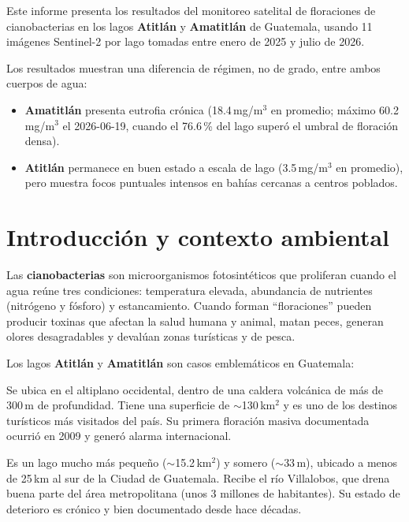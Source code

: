 \documentclass[12pt, a4paper]{article}
\newcommand{\lago}[1]{\textbf{#1}}
\newcommand{\mgm}{\,mg/m$^3$}
\newcommand{\kmsq}{\,km$^2$}
\begin{document}
Este informe presenta los resultados del monitoreo satelital de floraciones de cianobacterias
en los lagos \lago{Atitlán} y \lago{Amatitlán} de Guatemala, usando 11 imágenes
Sentinel-2 por lago tomadas entre enero de 2025 y julio de 2026.

Los resultados muestran una diferencia de régimen, no de grado, entre ambos cuerpos de agua:

\begin{itemize}[leftmargin=1.5em]
  \item \lago{Amatitlán} presenta eutrofia crónica (18.4\mgm{} en promedio; máximo 60.2\mgm{}
        el 2026-06-19, cuando el 76.6\,\% del lago superó el umbral de floración densa).
  \item \lago{Atitlán} permanece en buen estado a escala de lago (3.5\mgm{} en promedio),
        pero muestra focos puntuales intensos en bahías cercanas a centros poblados.
\end{itemize}

\tableofcontents
\newpage

\section{Introducción y contexto ambiental}

Las \textbf{cianobacterias} son microorganismos fotosintéticos que proliferan cuando el agua
reúne tres condiciones: temperatura elevada, abundancia de nutrientes (nitrógeno y fósforo) y
estancamiento. Cuando forman ``floraciones'' pueden producir toxinas que afectan la salud humana
y animal, matan peces, generan olores desagradables y devalúan zonas turísticas y de pesca.

Los lagos \lago{Atitlán} y \lago{Amatitlán} son casos emblemáticos en Guatemala:

\begin{description}[leftmargin=1.5em, font=\bfseries]
  \item[Lago Atitlán] Se ubica en el altiplano occidental, dentro de una caldera volcánica de
        más de 300\,m de profundidad. Tiene una superficie de $\sim$130\kmsq{} y es uno de los
        destinos turísticos más visitados del país. Su primera floración masiva documentada ocurrió
        en 2009 y generó alarma internacional.
  \item[Lago Amatitlán] Es un lago mucho más pequeño ($\sim$15.2\kmsq) y somero ($\sim$33\,m),
        ubicado a menos de 25\,km al sur de la Ciudad de Guatemala. Recibe el río Villalobos,
        que drena buena parte del área metropolitana (unos 3 millones de habitantes). Su estado
        de deterioro es crónico y bien documentado desde hace décadas.
\end{description}
\end{document}
